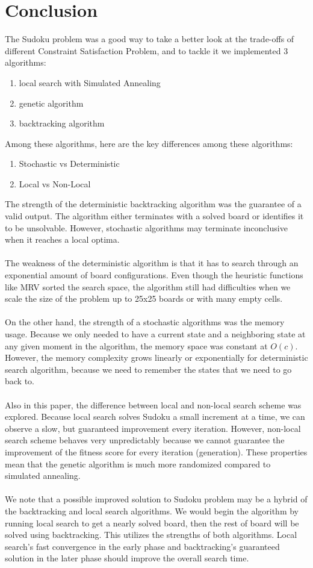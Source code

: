 \documentclass[12pt, a4paper]{article}
\begin{document}
	\section{Conclusion}
		The Sudoku problem was a good way to take a better look at the trade-offs of different Constraint Satisfaction Problem, and to tackle it we implemented 3 algorithms:
		\begin{enumerate}
			\item local search with Simulated Annealing
			\item genetic algorithm
			\item backtracking algorithm
		\end{enumerate}
		Among these algorithms, here are the key differences among these algorithms:
		\begin{enumerate}
			\item Stochastic vs Deterministic
			\item Local vs Non-Local 
		\end{enumerate}
		The strength of the deterministic backtracking algorithm was the guarantee of a valid output. The algorithm either terminates with a solved board or identifies it to be unsolvable. However, stochastic algorithms may terminate inconclusive when it reaches a local optima.\\\\
		The weakness of the deterministic algorithm is that it has to search through an exponential amount of board configurations. Even though the heuristic functions like MRV sorted the search space, the algorithm still had difficulties when we scale the size of the problem up to 25x25 boards or with many empty cells.\\\\		
		On the other hand, the strength of a stochastic algorithms was the memory usage. Because we only needed to have a current state and a neighboring state at any given moment in the algorithm, the memory space was constant at $O(c)$. However, the memory complexity grows linearly or exponentially for deterministic search algorithm, because we need to remember the states that we need to go back to.\\\\		
		Also in this paper, the difference between local and non-local search scheme was explored. Because local search solves Sudoku a small increment at a time, we can observe a slow, but guaranteed improvement every iteration. However, non-local search scheme behaves very unpredictably because we cannot guarantee the improvement of the fitness score for every iteration (generation). These properties mean that the genetic algorithm is much more randomized compared to simulated annealing.\\\\ 		
		We note that a possible improved solution to Sudoku problem may be a hybrid of the backtracking and local search algorithms. We would begin the algorithm by running local search to get a nearly solved board, then the rest of board will be solved using backtracking. This utilizes the strengths of both algorithms. Local search's fast convergence in the early phase and backtracking's guaranteed solution in the later phase should improve the overall search time.
\end{document}
